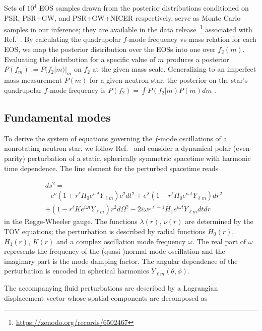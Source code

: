 \documentclass[aps,prd,twocolumn,superscriptaddress,footinbib]{revtex4-1}
\begin{document}
Sets of $10^4$ EOS samples drawn from the posterior distributions conditioned on PSR, PSR+GW, and PSR+GW+NICER respectively, serve as Monte Carlo samples in our inference; they are available in the data release~\footnote{\url{https://zenodo.org/records/6502467}} associated with Ref.~\cite{LegredChatziioannou2021}. By calculating the quadrupolar $f$-mode frequency vs mass relation for each EOS, we map the posterior distribution over the EOSs into one over $f_2(m)$. Evaluating the distribution for a specific value of $m$ produces a posterior $P(f_m) := P(f_2|m)|_m$ on $f_2$ at the given mass scale. Generalizing to an imperfect mass measurement $P(m)$ for a given neutron star, the posterior on the star's quadrupolar $f$-mode frequency is $P(f_2) = \int P(f_2|m) P(m) dm$ .

\subsection{Fundamental modes}

To derive the system of equations governing the $f$-mode oscillations of a nonrotating neutron star, we follow Ref.~\cite{thorne1967non} and consider a dynamical polar (even-parity) perturbation of a static, spherically symmetric spacetime with harmonic time dependence. The line element for the perturbed spacetime reads

\begin{align}
&ds^{2} = \nonumber \\ &-e^{\nu}\left(1+r^{\ell} H_{0} e^{i \omega t} Y_{\ell m}\right) c^{2} d t^{2}
+e^{\lambda}\left(1-r^{\ell} H_{0} e^{i \omega t} Y_{\ell m}\right) d r^{2} \nonumber \\
&+\left(1-r^{\ell} K e^{i \omega t} Y_{\ell m}\right) r^{2} d \Omega^{2}
-2 i \omega r^{\ell+1} H_{1} e^{i \omega t} Y_{\ell m} d t d r
\end{align}
in the Regge-Wheeler gauge. The functions $\lambda(r)$, $\nu(r)$ are determined by the TOV equations; the perturbation is described by radial functions $H_0(r)$, $H_1(r)$, $K(r)$ and a complex oscillation mode frequency $\omega$. The real part of $\omega$ represents the frequency of the (quasi-)normal mode oscillation and the imaginary part is the mode damping factor. The angular dependence of the perturbation is encoded in spherical harmonics $Y_{\ell m}(\theta, \phi)$.

The accompanying fluid perturbations are described by a Lagrangian displacement vector whose spatial components are decomposed as
\end{document}
